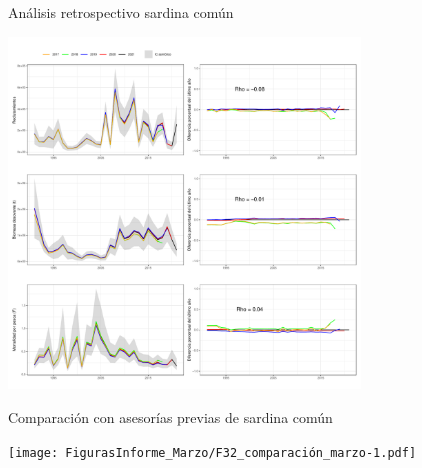 \documentclass[
  ignorenonframetext,
]{beamer}
\begin{document}
\begin{frame}{}
\protect\hypertarget{section-1}{}
\end{frame}

\begin{frame}{Análisis retrospectivo sardina común}
\protect\hypertarget{anuxe1lisis-retrospectivo-sardina-comuxfan}{}
\begin{center}
\includegraphics[width=0.7\textwidth]{FigurasInforme_Marzo/F33_retrospectivo_marzo-1.pdf}
\end{center}
\end{frame}

\begin{frame}{Comparación con asesorías previas de sardina común}
\protect\hypertarget{comparaciuxf3n-con-asesoruxedas-previas-de-sardina-comuxfan}{}
\begin{center}
\texttt{[image: FigurasInforme\_Marzo/F32\_comparación\_marzo-1.pdf]}
\end{center}
\end{frame}
\end{document}
